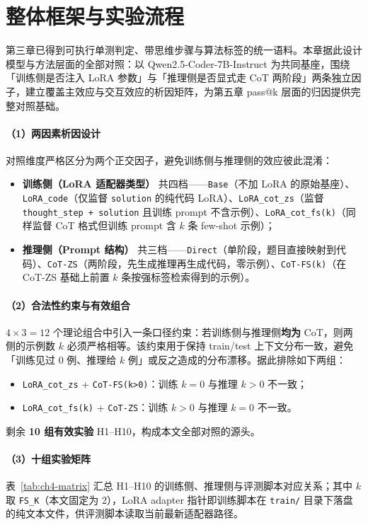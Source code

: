 \section{整体框架与实验流程}

第三章已得到可执行单测判定、带思维步骤与算法标签的统一语料。本章据此设计模型与方法层面的全部对照：以 Qwen2.5-Coder-7B-Instruct 为共同基座，围绕「训练侧是否注入 LoRA 参数」与「推理侧是否显式走 CoT 两阶段」两条独立因子，建立覆盖主效应与交互效应的析因矩阵，为第五章 pass@k 层面的归因提供完整对照基础。

\paragraph{（1）两因素析因设计}
对照维度严格区分为两个正交因子，避免训练侧与推理侧的效应彼此混淆：
\begin{itemize}
    \item \textbf{训练侧（LoRA 适配器类型）} 共四档——\texttt{Base}（不加 LoRA 的原始基座）、\texttt{LoRA\_code}（仅监督 \texttt{solution} 的纯代码 LoRA）、\texttt{LoRA\_cot\_zs}（监督 \texttt{thought\_step + solution} 且训练 prompt 不含示例）、\texttt{LoRA\_cot\_fs(k)}（同样监督 CoT 格式但训练 prompt 含 $k$ 条 few-shot 示例）；
    \item \textbf{推理侧（Prompt 结构）} 共三档——\texttt{Direct}（单阶段，题目直接映射到代码）、\texttt{CoT-ZS}（两阶段，先生成推理再生成代码，零示例）、\texttt{CoT-FS(k)}（在 CoT-ZS 基础上前置 $k$ 条按强标签检索得到的示例）。
\end{itemize}

\paragraph{（2）合法性约束与有效组合}
$4 \times 3 = 12$ 个理论组合中引入一条口径约束：若训练侧与推理侧\textbf{均为} CoT，则两侧的示例数 $k$ 必须严格相等。该约束用于保持 train/test 上下文分布一致，避免「训练见过 0 例、推理给 $k$ 例」或反之造成的分布漂移。据此排除如下两组：
\begin{itemize}
    \item \texttt{LoRA\_cot\_zs} + \texttt{CoT-FS(k>0)}：训练 $k{=}0$ 与推理 $k{>}0$ 不一致；
    \item \texttt{LoRA\_cot\_fs(k)} + \texttt{CoT-ZS}：训练 $k{>}0$ 与推理 $k{=}0$ 不一致。
\end{itemize}
剩余 \textbf{10 组有效实验} H1--H10，构成本文全部对照的源头。

\paragraph{（3）十组实验矩阵}
表~\ref{tab:ch4-matrix} 汇总 H1--H10 的训练侧、推理侧与评测脚本对应关系；其中 $k$ 取 \texttt{FS\_K}（本文固定为 $2$），LoRA adapter 指针即训练脚本在 \texttt{train/} 目录下落盘的纯文本文件，供评测脚本读取当前最新适配器路径。

